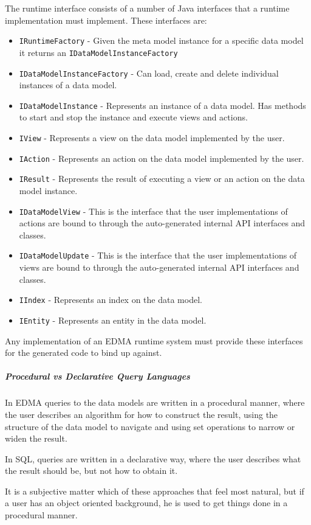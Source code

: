 The runtime interface consists of a number of Java interfaces that
a runtime implementation must implement. These interfaces are:
\begin{itemize}
\item \texttt{IRuntimeFactory} - Given the meta model instance for a specific
data model it returns an \texttt{IDataModelInstanceFactory}
\item \texttt{IDataModelInstanceFactory} - Can load, create and delete individual
instances of a data model.
\item \texttt{IDataModelInstance} - Represents an instance of a data model.
Has methods to start and stop the instance and execute views and actions.
\item \texttt{IView} - Represents a view on the data model implemented by
the user.
\item \texttt{IAction} - Represents an action on the data model implemented
by the user.
\item \texttt{IResult} - Represents the result of executing a view or an
action on the data model instance.
\item \texttt{IDataModelView} - This is the interface that the user implementations
of actions are bound to through the auto-generated internal API interfaces
and classes.
\item \texttt{IDataModelUpdate} - This is the interface that the user implementations
of views are bound to through the auto-generated internal API interfaces
and classes.
\item \texttt{IIndex} - Represents an index on the data model.
\item \texttt{IEntity} - Represents an entity in the data model.
\end{itemize}
Any implementation of an EDMA runtime system must provide these interfaces
for the generated code to bind up against.


\subparagraph{Procedural vs Declarative Query Languages}

In EDMA queries to the data models are written in a procedural manner,
where the user describes an algorithm for how to construct the result,
using the structure of the data model to navigate and using set operations
to narrow or widen the result.

In SQL, queries are written in a declarative way, where the user describes
what the result should be, but not how to obtain it.

It is a subjective matter which of these approaches that feel most
natural, but if a user has an object oriented background, he is used
to get things done in a procedural manner.

